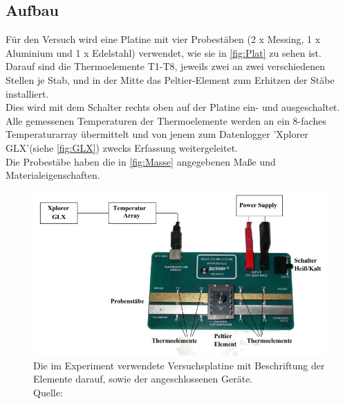 \subsection{Aufbau}
\label{subsec:Aufbau}
Für den Versuch wird eine Platine mit vier Probestäben (2 x Messing, 1 x Aluminium und 1 x Edelstahl)
verwendet, wie sie in \autoref{fig:Plat} zu sehen ist. \\
Darauf sind die Thermoelemente T1-T8, jeweils zwei
an zwei verschiedenen Stellen je Stab, und in der Mitte das Peltier-Element zum Erhitzen der Stäbe installiert.\\
Dies wird mit dem Schalter rechts oben auf der Platine ein- und ausgeschaltet. \\
Alle gemessenen Temperaturen der Thermoelemente werden an ein 8-faches Temperaturarray
übermittelt und von jenem zum Datenlogger 'Xplorer GLX'(siehe \autoref{fig:GLX}) zwecks Erfassung weitergeleitet. \\
Die Probestäbe haben die in \autoref{fig:Masse} angegebenen Maße und Materialeigenschaften.
\begin{figure}[H]
    \centering
    \includegraphics[scale=0.8]{content/Aufbau.png}
    \caption{Die im Experiment verwendete Versuchsplatine mit Beschriftung der Elemente darauf, sowie der angeschlossenen Geräte. \\Quelle:\cite{sample}}
    \label{fig:Plat}
\end{figure}
